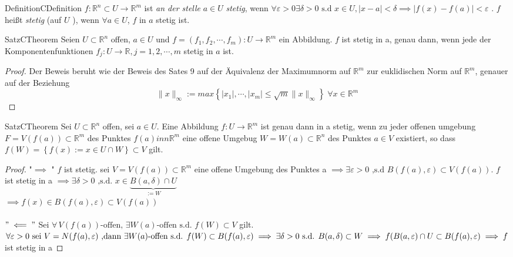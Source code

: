 \documentclass[11.5 pt, a4paper]{memoir}
\begin{document}
\begin{ibox}[]{Definition}{CDefinition}
    $ f: \mathbb{R}^n  \subset U \to \mathbb{R}^m $ ist \textit{an der stelle} $ a \in  U $ \textit{stetig}, wenn $ \forall \varepsilon 
	>0 \exists \delta >0 \text{ s.d } x \in  U, \left| x-a \right| < \delta \implies \left| f(x)-f(a) \right| < \varepsilon $ . $ f $ heißt
	\textit{stetig} (auf $ U $ ), wenn $ \forall  a \in U $, $ f \text{ in } a $ stetig ist. 
\end{ibox}

\begin{ibox}[14]{Satz}{CTheorem}
    Seien $ U \subset \mathbb{R}^n  $ offen, $ a \in  U $ und $ f=(f_1,f_2,\cdots, f_m): U \to \mathbb{R}^m  $ ein Abbildung. $ f $ ist 
	stetig in a, genau dann, wenn jede der Komponentenfunktionen $ f_{j} :U \to \mathbb{R} , j = 1,2, \cdots, m $ stetig in $ a $ ist.
\end{ibox}

\begin{proof}
	Der Beweis beruht wie der Beweis des Sates 9 auf der Äquivalenz der Maximumnorm auf $ \mathbb{R}^m $ zur euklidischen Norm auf 
	$ \mathbb{R}^m $, genauer auf der Beziehung
	$$ \|x \|_{\infty}:= max \left\{ \left| x_1 \right| ,\cdots, \left| x_m \right| \leq \sqrt{m} \|x \|_{\infty} \right\} \;  
	\forall  x \in  \mathbb{R}^m$$
	
\end{proof}
\begin{ibox}[15]{Satz}{CTheorem}
    Sei $ U \subset  \mathbb{R}^n  $ offen, sei $ a \in  U $. Eine Abbildung $ f: U \to \mathbb{R}^m $ ist genau dann in a stetig,
	wenn zu jeder offenen umgebung $ F=V(f(a)) \subset \mathbb{R}^m $ des Punktes $ f(a)inn \mathbb{R}^m $ eine offene Umgebug
	$ W = W(a) \subset  \mathbb{R}^n  $ des Punktes $ a \in  V$ existiert, so dass $ f(W) = \left\{ f(x) := x \in U \cap W \right\} 
	\subset  V$ gilt. 
\end{ibox}

\begin{proof}
	"$  \implies$ " $ f $ ist stetig. sei $ V = V \left( f \left( a \right)  \right)  \subset  \mathbb{R}^m $ 
	eine offene Umgebung des Punktes a  $ \implies \exists 
	\varepsilon  >0 \text{ ,s.d } B(f(a), \varepsilon ) \subset  V(f(a))$. $ f $ ist stetig in a $ \implies \exists \delta > 0 
	\text{ ,s.d. } x \in  \underbrace{B(a, \delta) \cap U}_{:=W} $ \\ $\implies f(x) \in B(f(a), \varepsilon ) \subset  V(f(a))$\\ \\
	$ "\impliedby" $ Sei $ \forall \, V(f(a)) \text{-offen, } \exists W(a) \text{-offen s.d. } f(W) \subset  V $ gilt.
	$ \forall \varepsilon >0 \text{ sei } V = N(f(a), \varepsilon ) \\
	\text{ ,dann } \exists W(a) \text{-offen s.d. } f(W) \subset B(f(a), \varepsilon ) \implies 
	\exists  \delta >0 \text{ s.d. } B(a,\delta) \subset  W \\ 
	\implies  f(B(a, \varepsilon ) \cap U \subset B(f(a), \varepsilon ) \implies 
	f$ ist stetig in a   
\end{proof}
\end{document}

